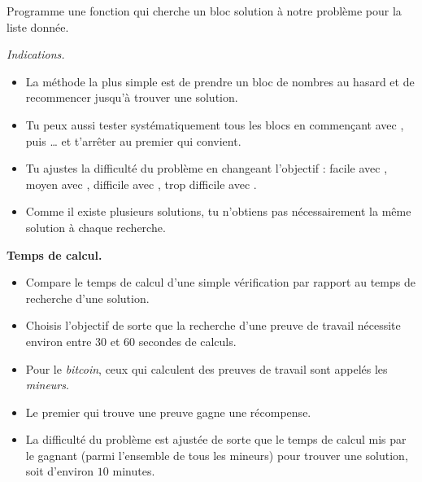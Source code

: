 \documentclass[12pt,class=report,crop=false]{standalone}
\begin{document}
  Programme une fonction  qui cherche un bloc  solution à notre problème pour la liste donnée. 
  
  \bigskip
  
  \emph{Indications.}
  
  \begin{itemize}
    \item La méthode la plus simple est de prendre un bloc  de nombres au hasard et de recommencer jusqu'à trouver une solution.
    
    \item Tu peux aussi tester systématiquement tous les blocs en commençant avec \ci{[0,0,0,0,0,0]}, puis \ci{[0,0,0,0,0,1]}\ldots{} et t'arrêter au premier qui convient.
    
    \item Tu ajustes la difficulté du problème en changeant l'objectif : facile avec , moyen avec , difficile avec , trop difficile avec .
    
    \item Comme il existe plusieurs solutions, tu n'obtiens pas nécessairement la même solution à chaque recherche. 
    
   \end{itemize}
   
\newpage   

 \textbf{Temps de calcul.}
   
   \begin{itemize}
   \item  Compare le temps de calcul d'une simple vérification par rapport au temps de recherche d'une solution. 
   
   \item Choisis l'objectif  de sorte que la recherche d'une preuve de travail nécessite environ entre 30 et 60 secondes de calculs.
  
  \item Pour le \emph{bitcoin}, ceux qui calculent des preuves de travail sont appelés les \emph{mineurs}. 
  
  \item Le premier qui trouve une preuve gagne une récompense. 
  
  \item La difficulté du problème est ajustée de sorte 
que le temps de calcul mis par le gagnant (parmi l'ensemble de tous les mineurs) pour trouver une solution, soit d'environ $10$ minutes.

  \end{itemize}
\end{document}
